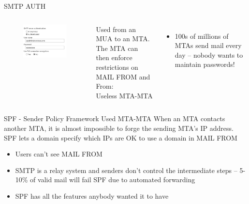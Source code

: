 \documentclass[nobackground,dvipsnames,table]{beamer}
\begin{document}
\begin{frame}{SMTP AUTH}
    \begin{columns}
            \begin{figure}
                \centering
                \includegraphics[width=\textwidth]{smtp-server-auth}
            \end{figure}
            Used from an MUA to an MTA.\\
            The MTA can then enforce restrictions on MAIL FROM and From:\\
            Useless MTA-MTA\\
            \begin{itemize}
                \item 100s of millions of MTAs send mail every day -- nobody wants to maintain passwords!
            \end{itemize}
    \end{columns}
\end{frame}

\begin{frame}{SPF - Sender Policy Framework}
    Used MTA-MTA
    When an MTA contacts another MTA, it is almost impossible to forge the sending MTA’s IP address.
    SPF lets a domain specify which IPs are OK to use a domain in MAIL FROM
    \begin{itemize}
        \item Users can’t see MAIL FROM
        \item SMTP is a relay system and senders don’t control the intermediate steps -- 5-10\% of valid mail will fail SPF due to automated forwarding
        \item SPF has all the features anybody wanted it to have
    \end{itemize}
\end{frame}
\end{document}
